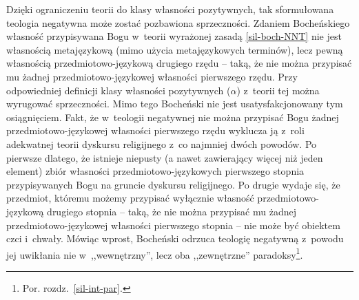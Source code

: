 
Dzięki ograniczeniu teorii do klasy własności pozytywnych, tak sformułowana teologia negatywna może zostać pozbawiona sprzeczności. Zdaniem Bocheńskiego własność przypisywana Bogu w~teorii wyrażonej zasadą \ref{sil-boch-NNT} nie jest własnością metajęzykową (mimo użycia metajęzykowych terminów), lecz pewną własnością prze\-dmio\-to\-wo-językową drugiego rzędu -- taką, że nie można przypisać mu żadnej prze\-dmio\-to\-wo-językowej własności pierwszego rzędu. Przy odpowiedniej definicji klasy własności pozytywnych ($\alpha$) z~teorii tej można wyrugować sprzeczności. Mimo tego Bocheński nie jest usatysfakcjonowany tym osiągnięciem. Fakt, że w~teologii negatywnej nie można przypisać Bogu żadnej przedmiotowo-językowej własności pierwszego rzędu wyklucza ją z~roli adekwatnej teorii dyskursu religijnego z~co najmniej dwóch powodów. Po pierwsze dlatego, że istnieje niepusty (a nawet zawierający więcej niż jeden element) zbiór własności przedmiotowo-językowych pierwszego stopnia przypisywanych Bogu na gruncie dyskursu religijnego. Po drugie wydaje się, że przedmiot, któremu możemy przypisać wyłącznie własność przedmio\-to\-wo-językową drugiego stopnia -- taką, że nie można przypisać mu żadnej przedmiotowo-językowej własności pierwszego stopnia -- nie może być obiektem czci i~chwały. Mówiąc wprost, Bocheński odrzuca teologię negatywną z~powodu jej uwikłania nie w~,,wewnętrzny'', lecz oba ,,zewnętrzne'' paradoksy\footnote{Por. rozdz.~\ref{sil-int-par}.}.


